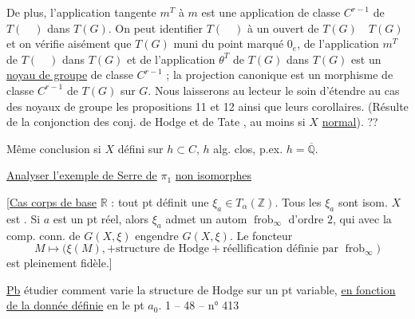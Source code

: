 De plus, l'application tangente $m^T$ à $m$ est une application de classe $C^{r-1}$
de $T(\quad)$ dans $T(G)$. On peut identifier $T(\quad)$ à un ouvert de $T(G)\quad T(G)$ et on
vérifie aisément que $T(G)$ muni du point marqué $0_e$, de l'application $m^T$ de $T(\quad)$
dans $T(G)$ et de l'application $\theta^T$ de $T(G)$ dans $T(G)$ est un \uline{noyau de groupe} de
classe $C^{r-1}$ ; la projection canonique est un morphisme de classe $C^{r-1}$ de $T(G)$
sur $G$. Nous laisserons au lecteur le soin d'étendre au cas des noyaux de groupe
les propositions 11 et 12 ainsi que leurs corollaires.
(Résulte de la conjonction des conj. de
Hodge et de Tate , au moins si $X$
\uline{normal}). \uline{} ??

Même conclusion si $X$ défini sur $h\subset C$, $h$ alg.
clos, p.ex. $h=\overline{\mathbb Q}$.

\uline{Analyser l'exemple de Serre de} $\pi_1$ \uline{non
isomorphes}

[\uline{Cas corps de base} $\mathbb R$ : tout pt  définit
une $\xi_a\in T_\alpha(\mathbb Z)$. Tous les $\xi_a$ sont isom.
  $X$ est .
Si $a$ est un pt réel, alors $\xi_a$ admet
un autom $\operatorname{frob}_\infty$ d'ordre $2$, qui
avec la comp. conn. de $G(X,\xi)$ engendre
$G(X,\xi)$. Le foncteur
\[
M\longmapsto\bigl(\xi(M),+\text{structure de Hodge}
+\text{réellification définie par }\operatorname{frob}_\infty\bigr)
\]
est pleinement fidèle.]


\uline{Pb} étudier comment varie la structure
de Hodge sur un pt  variable, \uline{en fonction de
la donnée définie} en le pt $a_0$.
1 -- 48 -- \hfill n° 413

